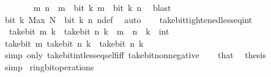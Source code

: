 \begin{isabellebody}
\ \ \ \ \ \ \isamarkupfalse%
\ {\isacartoucheopen}{\isasymAnd}m{\isachardot}{\kern0pt}\ n\ {\isasymle}\ m\ {\isasymLongrightarrow}\ bit\ k\ m\ {\isacharequal}{\kern0pt}\ bit\ k\ n{\isacartoucheclose}\ \isamarkupfalse%
\ blast\isanewline
\ \ \ \ \ \ \isamarkupfalse%
\ {\isacartoucheopen}bit\ k\ {\isacharparenleft}{\kern0pt}Max\ N{\isacharparenright}{\kern0pt}\ {\isasymnoteq}\ bit\ k\ n{\isacartoucheclose}\ n{\isacharunderscore}{\kern0pt}def\ \isamarkupfalse%
\ auto\isanewline
\ \ \isamarkupfalse%
\isanewline
{}\isamarkupfalse%
%
\endisatagproof
{\isafoldproof}%
%
\isadelimproof
\isanewline
%
\endisadelimproof
\isanewline
{}\isamarkupfalse%
\ take{\isacharunderscore}{\kern0pt}bit{\isacharunderscore}{\kern0pt}tightened{\isacharunderscore}{\kern0pt}less{\isacharunderscore}{\kern0pt}eq{\isacharunderscore}{\kern0pt}int{\isacharcolon}{\kern0pt}\isanewline
\ \ {\isacartoucheopen}take{\isacharunderscore}{\kern0pt}bit\ m\ k\ {\isasymle}\ take{\isacharunderscore}{\kern0pt}bit\ n\ k{\isacartoucheclose}\ \ {\isacartoucheopen}m\ {\isasymle}\ n{\isacartoucheclose}\ \ k\ {\isacharcolon}{\kern0pt}{\isacharcolon}{\kern0pt}\ int\isanewline
%
\isadelimproof
%
\endisadelimproof
%
\isatagproof
{}\isamarkupfalse%
\ {\isacharminus}{\kern0pt}\isanewline
\ \ \isamarkupfalse%
\ {\isacartoucheopen}take{\isacharunderscore}{\kern0pt}bit\ m\ {\isacharparenleft}{\kern0pt}take{\isacharunderscore}{\kern0pt}bit\ n\ k{\isacharparenright}{\kern0pt}\ {\isasymle}\ take{\isacharunderscore}{\kern0pt}bit\ n\ k{\isacartoucheclose}\isanewline
\ \ \ \ \isamarkupfalse%
\ {\isacharparenleft}{\kern0pt}simp\ only{\isacharcolon}{\kern0pt}\ take{\isacharunderscore}{\kern0pt}bit{\isacharunderscore}{\kern0pt}int{\isacharunderscore}{\kern0pt}less{\isacharunderscore}{\kern0pt}eq{\isacharunderscore}{\kern0pt}self{\isacharunderscore}{\kern0pt}iff\ take{\isacharunderscore}{\kern0pt}bit{\isacharunderscore}{\kern0pt}nonnegative{\isacharparenright}{\kern0pt}\isanewline
\ \ \isamarkupfalse%
\ that\ \isamarkupfalse%
\ {\isacharquery}{\kern0pt}thesis\isanewline
\ \ \ \ \isamarkupfalse%
\ simp\isanewline
{}\isamarkupfalse%
%
\endisatagproof
{\isafoldproof}%
%
\isadelimproof
\isanewline
%
\endisadelimproof
\isanewline
{}\isamarkupfalse%
\ ring{\isacharunderscore}{\kern0pt}bit{\isacharunderscore}{\kern0pt}operations\isanewline
{}\isanewline

\end{isabellebody}
